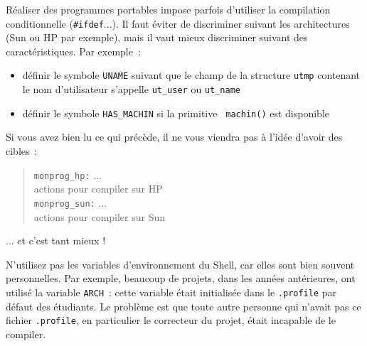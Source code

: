 
Réaliser des programmes portables impose parfois d'utiliser la
compilation conditionnelle (\verb|#ifdef|...).  Il faut éviter
de discriminer suivant les architectures (Sun ou HP par exemple), mais
il vaut mieux discriminer suivant des caractéristiques. Par exemple~:

\begin {itemize}
    \item définir le symbole {\tt UNAME} suivant que le champ de la
	structure {\tt utmp} contenant le nom d'utilisateur s'appelle
	{\tt ut\_user} ou {\tt ut\_name}

    \item définir le symbole {\tt HAS\_MACHIN} si la primitive {\tt
	machin()} est disponible

\end {itemize}



Si vous avez bien lu ce qui précède, il ne vous viendra pas à l'idée
d'avoir des cibles~:

\begin {quote}
{\tt monprog\_hp:} ... \\
\hspace* {10mm} actions pour compiler sur HP \\
{\tt monprog\_sun:} ... \\
\hspace* {10mm} actions pour compiler sur Sun
\end {quote}

... et c'est tant mieux !



N'utilisez pas les variables d'environnement du Shell, car elles sont
bien souvent personnelles.
Par exemple, beaucoup de projets, dans les années antérieures, ont utilisé
la variable
{\tt ARCH}~: cette variable était initialisée dans le {\tt .profile}
par défaut des étudiants. Le problème est que toute autre personne qui
n'avait pas ce fichier {\tt .profile}, en particulier le correcteur
du projet, était incapable de le compiler.


